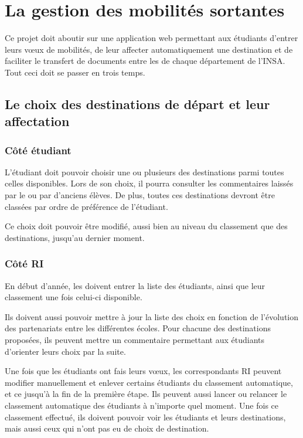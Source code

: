 
		\section{La gestion des mobilités sortantes}
		\label{sec::gestion_mobilite}
		
		Ce projet doit aboutir sur une application web permettant aux étudiants d'entrer leurs vœux de mobilités, de leur affecter automatiquement une destination et de faciliter le transfert de documents entre les \ris de chaque département de l'INSA. Tout ceci doit se passer en trois temps.
		
		 \subsection{Le choix des destinations de départ et leur affectation}
		 
		 \subsubsection{Côté étudiant}
		 
		 L'étudiant doit pouvoir choisir une ou plusieurs des destinations parmi toutes celles disponibles. Lors de son choix, il pourra consulter les commentaires laissés par le \ri ou par d'anciens élèves. De plus, toutes ces destinations devront être classées par ordre de préférence de l'étudiant.
		 
		 Ce choix doit pouvoir être modifié, aussi bien au niveau du classement que des destinations, jusqu'au dernier moment.
		 
		\subsubsection{Côté RI}
		
		En début d'année, les \ris doivent entrer la liste des étudiants, ainsi que leur classement une fois celui-ci disponible. 
		
		Ils doivent aussi pouvoir mettre à jour la liste des choix en fonction de l'évolution des partenariats entre les différentes écoles. Pour chacune des destinations proposées, ils peuvent mettre un commentaire permettant aux étudiants d'orienter leurs choix par la suite.
		
		Une fois que les étudiants ont fais leurs vœux, les correspondants RI peuvent modifier manuellement et enlever certains étudiants du classement automatique, et ce jusqu'à la fin de la première étape. Ils peuvent aussi lancer ou relancer le classement automatique des étudiants à n'importe quel moment. Une fois ce classement effectué, ils doivent pouvoir voir les étudiants et leurs destinations, mais aussi ceux qui n'ont pas eu de choix de destination.
		
